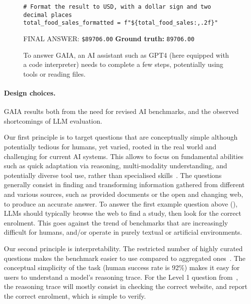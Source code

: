 \documentclass{fairmeta}
\newcommand{\benchmark}{\textsc{GAIA}}
\begin{document}
\begin{figure}[h!]
\begin{tcolorbox}[colframe=RoyalBlue, colback=white]
\begin{tcolorbox}[colframe=RoyalBlue, colback=gray!10]
\begin{verbatim}
# Format the result to USD, with a dollar sign and two decimal places
total_food_sales_formatted = f"${total_food_sales:,.2f}"
\end{verbatim}
\end{tcolorbox}
FINAL ANSWER: \texttt{\$89706.00} \hspace{1cm}\textbf{Ground truth:} \texttt{89706.00} \textcolor{Green}{{\Large \checkmark}}


    \end{tcolorbox}
    \caption{To answer \benchmark{}, an AI assistant such as GPT4 (here equipped with a code interpreter) needs to complete a few steps, potentially using tools or reading files.}
    \label{fig:demo_gpt4}
\end{figure}



\paragraph{Design choices.} \benchmark{} results both from the need for revised AI benchmarks, and the observed shortcomings of LLM evaluation. 

Our first principle is to target questions that are conceptually simple although potentially tedious for humans, yet varied, rooted in the real world and challenging for current AI systems. This allows to focus on fundamental abilities such as quick adaptation via reasoning, multi-modality understanding, and potentially diverse tool use, rather than specialised skills~\citep{chollet2019measure}. The questions generally consist in finding and transforming information gathered from different and various sources, such as provided documents or the open and changing web, to produce an accurate answer. 
To answer the first example question above (), LLMs should typically browse the web to find a study, then look for the correct enrolment. This goes against the trend of benchmarks that are increasingly difficult for humans, and/or operate in purely textual or artificial environments. 

Our second principle is interpretability.
The restricted number of highly curated questions makes the benchmark easier to use compared to aggregated ones~\citep{perlitz2023efficient}. The conceptual simplicity of the task (human success rate is 92\%) makes it easy for users to understand a model's reasoning trace.
For the Level 1 question from~, the reasoning trace will mostly consist in checking the correct website, and report the correct enrolment, which is simple to verify.
\end{document}
